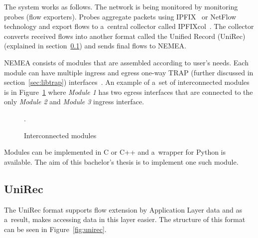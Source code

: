 The system works as follows. The network is being monitored by monitoring probes (flow exporters).
Probes aggregate packets using IPFIX~\cite{ipfix} or NetFlow~\cite{netflow} technology and
export flows to a~central collector called IPFIXcol~\cite{ipfixcol}. The collector converts received
flows into another format called the Unified Record (UniRec)~\cite{ipfixcol} (explained
in section~\ref{sec:unirec}) and sends final flows to NEMEA.

NEMEA consists of modules that are assembled according to user's needs.
Each module can have multiple ingress and egress one-way TRAP (further discussed in
section~\ref{sec:libtrap}) interfaces~\cite{NEMEA_article}.
An example of a~set of interconnected modules is in Figure~\ref{fig:modules}
where \textit{Module 1} has two egress interfaces
that are connected to the only \textit{Module 2} and \textit{Module 3} ingress interface.

\begin{figure}[H]
   \begin{center}
		 \hfill
      \caption{Interconnected modules} \label{fig:modules}.
	\end{center}
\end{figure}


Modules can be implemented in C or C++ and a~wrapper for Python is available.
The aim of this bachelor's thesis is to implement one such module.

\subsection{UniRec}\label{sec:unirec}
The UniRec format supports flow extension by Application Layer data and as a~result, makes accessing data in this layer easier.
The structure of this format can be seen in Figure~\ref{fig:unirec}.

